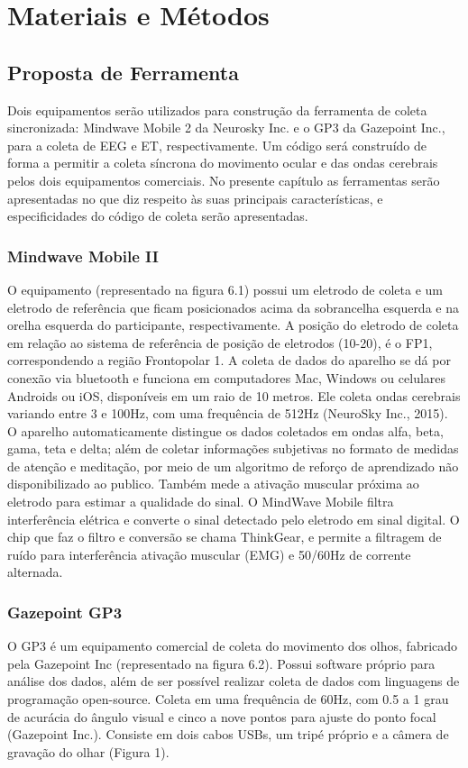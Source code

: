 \chapter{Materiais e Métodos}

\section{Proposta de Ferramenta}

Dois equipamentos serão utilizados para construção da ferramenta de coleta sincronizada: Mindwave Mobile 2 da Neurosky Inc. e o
GP3 da Gazepoint Inc., para a coleta de EEG e ET, respectivamente. Um código será construído de forma a permitir a coleta 
síncrona do movimento ocular e das ondas cerebrais pelos dois equipamentos comerciais. 
No presente capítulo as ferramentas serão apresentadas no que diz respeito às suas principais características, 
e especificidades do código de coleta serão apresentadas.

\subsection{Mindwave Mobile II}
O equipamento (representado na figura 6.1) possui um eletrodo de coleta e um eletrodo de referência que ficam posicionados 
acima da sobrancelha esquerda e na orelha esquerda do participante, respectivamente. 
A posição do eletrodo de coleta em relação ao sistema de referência de posição de eletrodos (10-20), é o FP1, 
correspondendo a região Frontopolar 1. A coleta de dados do aparelho se dá por conexão via bluetooth e 
funciona em computadores Mac, Windows ou celulares Androids ou iOS, disponíveis em um raio de 10 metros. 
Ele coleta ondas cerebrais variando entre 3 e 100Hz, com uma frequência de 512Hz (NeuroSky Inc., 2015). 
O aparelho automaticamente distingue os dados coletados em ondas alfa, beta, gama, teta e delta; 
além de coletar informações subjetivas no formato de medidas de atenção e meditação, 
por meio de um algoritmo de reforço de aprendizado não disponibilizado ao publico. 
Também mede a ativação muscular próxima ao eletrodo para estimar a qualidade do sinal. 
O MindWave Mobile filtra interferência elétrica e converte o sinal detectado pelo eletrodo em sinal digital. 
O chip que faz o filtro e conversão se chama ThinkGear, e permite a filtragem de ruído para interferência ativação muscular (EMG) e 50/60Hz de corrente alternada. 

\subsection{Gazepoint GP3}
O GP3 é um equipamento comercial de coleta do movimento dos olhos, 
fabricado pela Gazepoint Inc (representado na figura 6.2). Possui software próprio para análise dos dados, 
além de ser possível realizar coleta de dados com linguagens de programação open-source. 
Coleta em uma frequência de 60Hz, com 0.5 a 1 grau de acurácia do ângulo visual e cinco a nove 
pontos para ajuste do ponto focal (Gazepoint Inc.). Consiste em dois cabos USBs, um tripé próprio e a câmera de gravação do olhar (Figura 1). 


